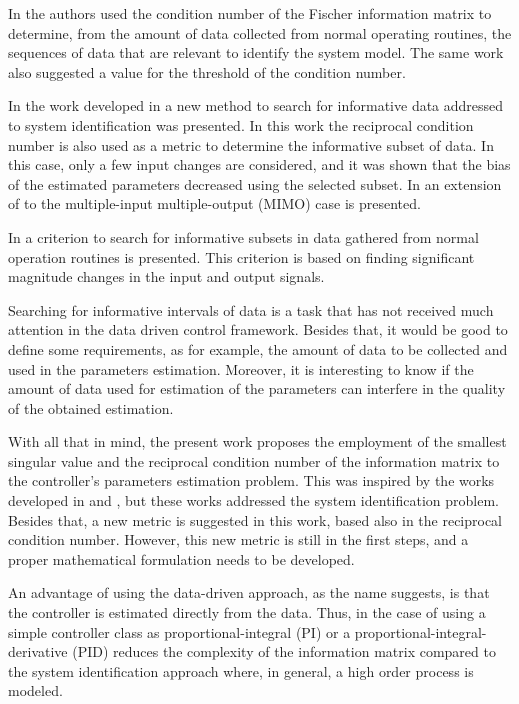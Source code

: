 \documentclass[letterpaper, 10 pt, conference]{ieeeconf}  %
\begin{document}
In \cite{shardt2013data} the authors used the condition number of the Fischer information matrix to determine, from the amount of data collected from normal operating routines, the sequences of data that are relevant to identify the system model.
The same work also suggested a value for the threshold of the condition number.

In the work developed in \cite{arengas2017searching} a new method to search for informative data addressed to system identification was presented.
In this work the reciprocal condition number is also used as a metric to determine the informative subset of data.
In this case, only a few input changes are considered, and it was shown that the bias of the estimated parameters decreased using the selected subset.
In \cite{arengas2017search} an extension of \cite{arengas2017searching} to the multiple-input multiple-output (MIMO) case is presented.

In \cite{wang2018searching} a criterion to search for informative subsets in data gathered from normal operation routines is presented.
This criterion is based on finding significant magnitude changes in the input and output signals.

Searching for informative intervals of data is a task that has not received much attention in the data driven control framework.
Besides that, it would be good to define some requirements, as for example, the amount of data to be collected and used in the parameters estimation.
Moreover, it is interesting to know if the amount of data used for estimation of the parameters can interfere in the quality of the obtained estimation.

With all that in mind, the present work proposes the employment of the smallest singular value and the reciprocal condition number of the information matrix to the controller's parameters estimation problem.
This was inspired by the works developed in \cite{carrette1996discarding} and \cite{bittencourt2015algorithm}, but these works addressed the system identification problem.
Besides that, a new metric is suggested in this work, based also in the reciprocal condition number.
However, this new metric is still in the first steps, and a proper mathematical formulation needs to be developed.

An advantage of using the data-driven approach, as the name suggests, is that the controller is estimated directly from the data.
Thus, in the case of using a simple controller class as proportional-integral (PI) or a proportional-integral-derivative (PID) reduces the complexity of the information matrix compared to the system identification approach where, in general, a high order process is modeled.
\end{document}

